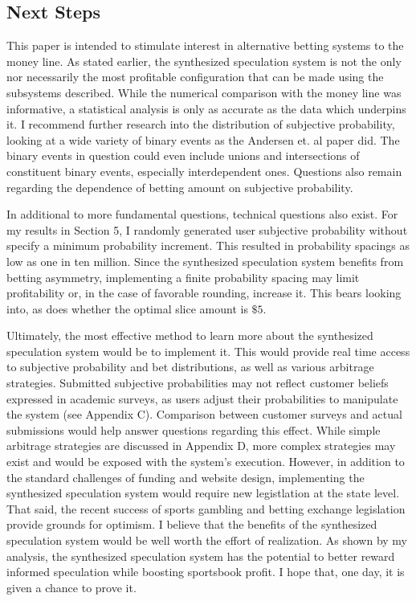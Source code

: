 \documentclass[sn-mathphys-num]{sn-jnl}
\theoremstyle{thmstyleone}%
\theoremstyle{thmstyletwo}%
\theoremstyle{thmstylethree}%
\begin{document}
\subsection{Next Steps}

This paper is intended to stimulate interest in alternative betting systems to the money line. As stated earlier, the synthesized speculation system is not the only nor necessarily the most profitable configuration that can be made using the subsystems described. While the numerical comparison with the money line was informative, a statistical analysis is only as accurate as the data which underpins it. I recommend further research into the distribution of subjective probability, looking at a wide variety of binary events as the Andersen et. al paper did. The binary events in question could even include unions and intersections of constituent binary events, especially interdependent ones. Questions also remain regarding the dependence of betting amount on subjective probability. 

In additional to more fundamental questions, technical questions also exist. For my results in Section 5, I randomly generated user subjective probability without specify a minimum probability increment. This resulted in probability spacings as low as one in ten million. Since the synthesized speculation system benefits from betting asymmetry, implementing a finite probability spacing may limit profitability or, in the case of favorable rounding, increase it. This bears looking into, as does whether the optimal slice amount is $\$5$.

Ultimately, the most effective method to learn more about the synthesized speculation system would be to implement it. This would provide real time access to subjective probability and bet distributions, as well as various arbitrage strategies. Submitted subjective probabilities may not reflect customer beliefs expressed in academic surveys, as users adjust their probabilities to manipulate the system (see Appendix C). Comparison between customer surveys and actual submissions would help answer questions regarding this effect. While simple arbitrage strategies are discussed in Appendix D, more complex strategies may exist and would be exposed with the system's execution. However, in addition to the standard challenges of funding and website design, implementing the synthesized speculation system would require new legistlation at the state level. That said, the recent success of sports gambling and betting exchange legislation provide grounds for optimism. I believe that the benefits of the synthesized speculation system would be well worth the effort of realization. As shown by my analysis, the synthesized speculation system has the potential to better reward informed speculation while boosting sportsbook profit. I hope that, one day, it is given a chance to prove it.
\end{document}
